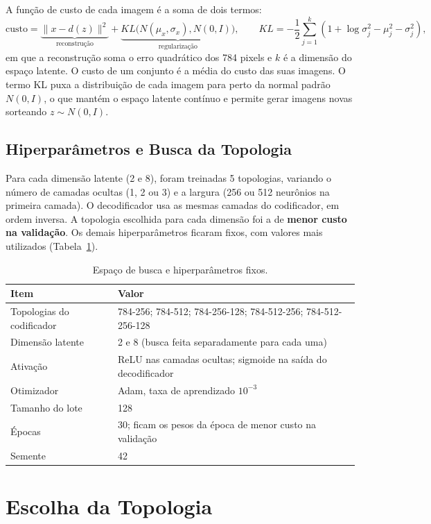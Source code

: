 \documentclass[11pt,a4paper]{article}
\begin{document}
A função de custo de cada imagem é a soma de dois termos:
\[
\text{custo} = \underbrace{\|x - d(z)\|^2}_{\text{reconstrução}} + \underbrace{KL\big(N(\mu_x, \sigma_x), N(0, I)\big)}_{\text{regularização}},
\qquad
KL = -\frac{1}{2}\sum_{j=1}^{k}\left(1 + \log\sigma_j^2 - \mu_j^2 - \sigma_j^2\right),
\]
em que a reconstrução soma o erro quadrático dos 784 pixels e $k$ é a dimensão do espaço latente. O custo de um conjunto é a média do custo das suas imagens. O termo KL puxa a distribuição de cada imagem para perto da normal padrão $N(0, I)$, o que mantém o espaço latente contínuo e permite gerar imagens novas sorteando $z \sim N(0, I)$.

\subsection{Hiperparâmetros e Busca da Topologia}

Para cada dimensão latente (2 e 8), foram treinadas 5 topologias, variando o número de camadas ocultas (1, 2 ou 3) e a largura (256 ou 512 neurônios na primeira camada). O decodificador usa as mesmas camadas do codificador, em ordem inversa. A topologia escolhida para cada dimensão foi a de \textbf{menor custo na validação}. Os demais hiperparâmetros ficaram fixos, com valores mais utilizados (Tabela~\ref{tab:hiper}).

\begin{table}[H]
\centering
\small
\caption{Espaço de busca e hiperparâmetros fixos.}
\label{tab:hiper}
\begin{tabularx}{\textwidth}{lX}
\toprule
\textbf{Item} & \textbf{Valor} \\
\midrule
Topologias do codificador & 784-256; 784-512; 784-256-128; 784-512-256; 784-512-256-128 \\
Dimensão latente & 2 e 8 (busca feita separadamente para cada uma) \\
Ativação & ReLU nas camadas ocultas; sigmoide na saída do decodificador \\
Otimizador & Adam, taxa de aprendizado $10^{-3}$ \\
Tamanho do lote & 128 \\
Épocas & 30; ficam os pesos da época de menor custo na validação \\
Semente & 42 \\
\bottomrule
\end{tabularx}
\end{table}

\section{Escolha da Topologia}
\end{document}
